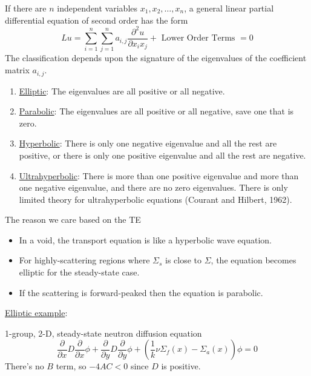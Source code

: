 \documentclass[12pt]{article}
\newcommand{\Macro}{\ensuremath{\Sigma}}
\begin{document}
If there are $n$ independent variables $x_1, x_2 , \dots, x_n$, a general linear partial differential equation of second order has the form
%
\begin{equation}
Lu = \sum_{i=1}^n \sum_{j=1}^n a_{i,j} \frac{\partial^2 u}{\partial x_i x_j} + \text{ Lower Order Terms } = 0 \nonumber
\end{equation}
%
The classification depends upon the signature of the eigenvalues of the coefficient matrix $a_{i,j}$.
\begin{enumerate}
\item \underline{Elliptic}: The eigenvalues are all positive or all negative.
\item \underline{Parabolic}: The eigenvalues are all positive or all negative, save one that is zero.
\item \underline{Hyperbolic}: There is only one negative eigenvalue and all the rest are positive, or there is only one positive eigenvalue and all the rest are negative.
\item \underline{Ultrahyperbolic}: There is more than one positive eigenvalue and more than one negative eigenvalue, and there are no zero eigenvalues. There is only limited theory for ultrahyperbolic equations (Courant and Hilbert, 1962).
\end{enumerate}

\noindent The reason we care based on the TE
\begin{itemize}
\item In a void, the transport equation is like a hyperbolic wave equation. 
\item For highly-scattering regions where $\Macro_{s}$ is close to $\Macro$, the equation becomes elliptic for the steady-state case. 
\item If the scattering is forward-peaked then the equation is parabolic.
\end{itemize}

\vspace*{1em}
\noindent \underline{Elliptic example}:

1-group, 2-D, steady-state neutron diffusion equation
%
\begin{equation}
\frac{\partial}{\partial x}D\frac{\partial}{\partial x}\phi + \frac{\partial}{\partial y}D\frac{\partial}{\partial y}\phi + (\frac{1}{k} \nu \Macro_f(x) - \Macro_a(x)) \phi = 0 \nonumber
\end{equation}
%
There's no $B$ term, so $-4AC < 0$ since $D$ is positive.
\end{document}
